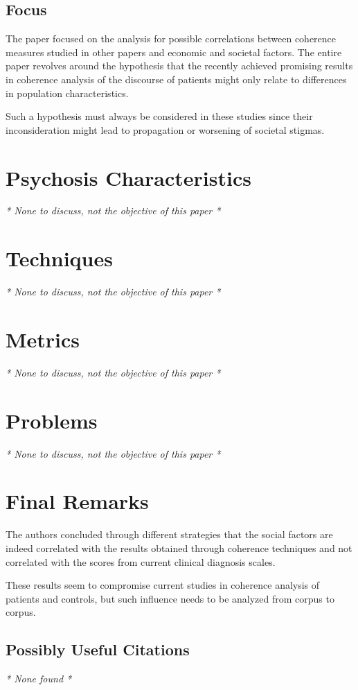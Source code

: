 \documentclass{Paper_Summary}
\begin{document}
\makepapertitle

\breakline

\begin{center}
    \section*{Focus}
\end{center}

    The paper focused on the analysis for possible correlations between coherence measures studied in other papers and economic and societal factors.
    The entire paper revolves around the hypothesis that the recently achieved promising results in coherence analysis of the discourse of patients might only relate to differences in population characteristics.

    Such a hypothesis must always be considered in these studies since their inconsideration might lead to propagation or worsening of societal stigmas.

\breakline

\newpage

\section{Psychosis Characteristics}
\emph{* None to discuss, not the objective of this paper *}


\section{Techniques}
\emph{* None to discuss, not the objective of this paper *}


\section{Metrics}
\emph{* None to discuss, not the objective of this paper *}


\section{Problems}
\emph{* None to discuss, not the objective of this paper *}


\section{Final Remarks}

    The authors concluded through different strategies that the social factors are indeed correlated with the results obtained through coherence techniques and not correlated with the scores from current clinical diagnosis scales.

    These results seem to compromise current studies in coherence analysis of patients and controls, but such influence needs to be analyzed from corpus to corpus.

\breakline

\begin{center}
    \section*{Possibly Useful Citations}
\end{center}
\emph{* None found *}
\end{document}

